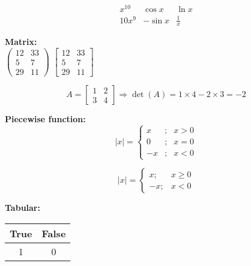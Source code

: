 \documentclass{article}
\begin{document}
$$
\begin{array}{ccc} %
x^{10} & \cos x & \ln x\\
10x^9 & -\sin x &\frac{1}{x}
\end{array}
$$

\vspace{1cm}
\textbf{Matrix:}\\

$
\left(
\begin{array}{rl} %
12 & 33 \\
5 & 7 \\
29 & 11
\end{array}
\right)
$
\hspace{8mm}
$
\left[
\begin{array}{cc} %
12 & 33 \\
5 & 7 \\
29 & 11
\end{array}
\right]
$
\newline

\[
A=
\left[
\begin{array}{cc} %
1 & 2 \\
3 & 4
\end{array}
\right]
\Rightarrow
\det(A)=1\times 4-2\times 3 = -2
\]


\vspace{1cm}
\textbf{Piecewise function: }\\

\[
|x| = 
\left\{ %
\begin{array}{lcc} %
x & ; & x>0\\
0 & ; & x=0\\
-x & ; & x<0
\end{array}
\right. %
\]

$$
|x| = 
\left\{ 
\begin{array}{rc} %
x; & x\ge 0\\
-x; & x<0 
\end{array}
\right.
$$


\newpage
\textbf{Tabular:} \\

\begin{tabular}{|c|c|}  %
\hline
True & False \\
\hline
1 & 0 \\
\hline
\end{tabular}
\end{document}
